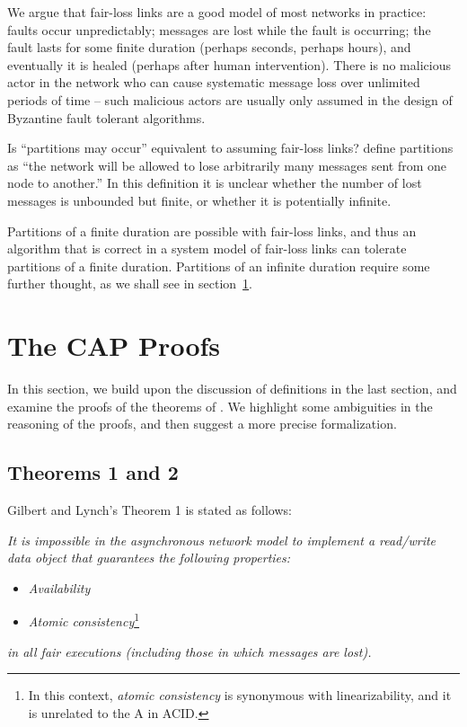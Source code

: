 \documentclass[fleqn,12pt,lineno]{wlpeerj} %
\begin{document}
We argue that fair-loss links are a good model of most networks in practice: faults occur
unpredictably; messages are lost while the fault is occurring; the fault lasts for some finite
duration (perhaps seconds, perhaps hours), and eventually it is healed (perhaps after human
intervention). There is no malicious actor in the network who can cause systematic message loss over
unlimited periods of time -- such malicious actors are usually only assumed in the design of
Byzantine fault tolerant algorithms.

Is ``partitions may occur'' equivalent to assuming fair-loss links? \citet{Gilbert2002il} define
partitions as ``the network will be allowed to lose arbitrarily
many messages sent from one node to another.'' In this definition it is unclear whether the number
of lost messages is unbounded but finite, or whether it is potentially infinite.

Partitions of a finite duration are possible with fair-loss links, and thus an algorithm that is
correct in a system model of fair-loss links can tolerate partitions of a finite duration.
Partitions of an infinite duration require some further thought, as we shall see in
section~\ref{sec:proofs}.

\section{The CAP Proofs}\label{sec:proofs}

In this section, we build upon the discussion of definitions in the last section, and examine the
proofs of the theorems of \citet{Gilbert2002il}. We highlight some ambiguities in
the reasoning of the proofs, and then suggest a more precise formalization.

\subsection{Theorems 1 and 2}\label{sec:theorem1}

Gilbert and Lynch's Theorem 1 is stated as follows:

\emph{It is impossible in the asynchronous network model to implement a read/write data object that
guarantees the following properties:}
\begin{itemize}
\item \emph{Availability}
\item \emph{Atomic consistency}\footnote{In this context, \emph{atomic consistency} is synonymous
with linearizability, and it is unrelated to the A in ACID.}
\end{itemize}
\emph{in all fair executions (including those in which messages are lost).}
\end{document}
